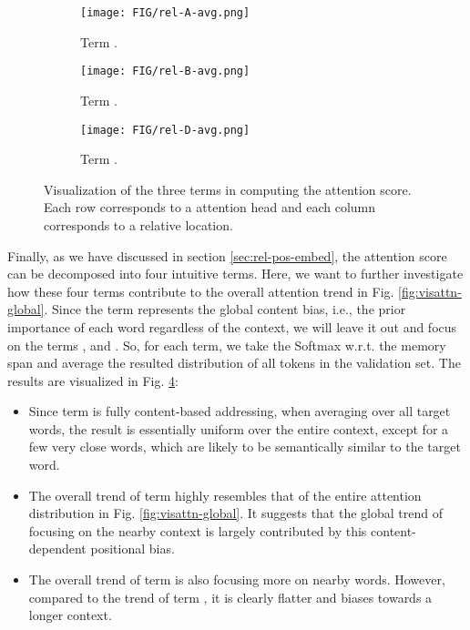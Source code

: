 \documentclass[11pt,a4paper]{article}
\begin{document}
\begin{figure}[!h]
	\begin{subfigure}[b]{\linewidth}
		\texttt{[image: FIG/rel-A-avg.png]}
		\caption{Term .}
		\label{fig:visattn-A}
	\end{subfigure}
	\begin{subfigure}[b]{\linewidth}
		\texttt{[image: FIG/rel-B-avg.png]}
		\caption{Term .}
		\label{fig:visattn-B}
	\end{subfigure}
	\begin{subfigure}[b]{\linewidth}
		\texttt{[image: FIG/rel-D-avg.png]}
		\caption{Term .}
		\label{fig:visattn-D}
	\end{subfigure}
	\caption{Visualization of the three terms in computing the attention score. Each row corresponds to a attention head and each column corresponds to a relative location.}
	\label{fig:visattn-decomp}
\end{figure}
Finally, as we have discussed in section \ref{sec:rel-pos-embed}, the attention score can be decomposed into four intuitive terms.
Here, we want to further investigate how these four terms contribute to the overall attention trend in Fig. \ref{fig:visattn-global}.
Since the term  represents the global content bias, i.e., the prior importance of each word regardless of the context, we will leave it out and focus on the terms ,  and .
So, for each term, we take the Softmax w.r.t. the memory span and average the resulted distribution of all tokens in the validation set.
The results are visualized in Fig. \ref{fig:visattn-decomp}:
\begin{itemize}[leftmargin=*]
	\item Since term  is fully content-based addressing, when averaging over all target words, the result is essentially uniform over the entire context, except for a few very close words, which are likely to be semantically similar to the target word.
	\item The overall trend of term  highly resembles that of the entire attention distribution in Fig. \ref{fig:visattn-global}. It suggests that the global trend of focusing on the nearby context is largely contributed by this content-dependent positional bias.
	\item The overall trend of term  is also focusing more on nearby words. However, compared to the trend of term , it is clearly flatter and biases towards a longer context.
\end{itemize}
\end{document}
